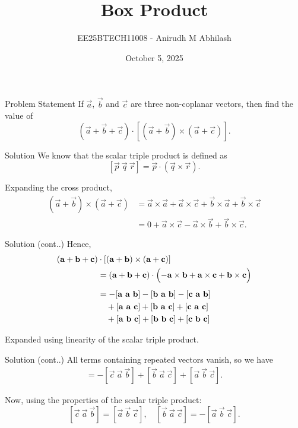 \documentclass{beamer}
\title{Box Product}
\author{EE25BTECH11008 - Anirudh M Abhilash}
\date{October 5, 2025}
\begin{document}
\begin{frame}
\titlepage
\end{frame}

\begin{frame}{Problem Statement}
If $\vec{a}$, $\vec{b}$ and $\vec{c}$ are three non-coplanar vectors, then find the value of  
\[
(\vec{a} + \vec{b} + \vec{c}) \cdot [(\vec{a} + \vec{b}) \times (\vec{a} + \vec{c})].
\]
\end{frame}

\begin{frame}{Solution}
We know that the scalar triple product is defined as  
\[
[\vec{p}\ \vec{q}\ \vec{r}] = \vec{p} \cdot (\vec{q} \times \vec{r}).
\]

Expanding the cross product,
\begin{align}
(\vec{a} + \vec{b}) \times (\vec{a} + \vec{c})
&= \vec{a} \times \vec{a} + \vec{a} \times \vec{c} + \vec{b} \times \vec{a} + \vec{b} \times \vec{c} \\[4pt]
&= 0 + \vec{a} \times \vec{c} - \vec{a} \times \vec{b} + \vec{b} \times \vec{c}.
\end{align}
\end{frame}

\begin{frame}{Solution (cont..)}
Hence,
\begin{align}
(\vec{a} + \vec{b} + \vec{c}) &\cdot [(\vec{a} + \vec{b}) \times (\vec{a} + \vec{c})] \notag\\
&= (\vec{a} + \vec{b} + \vec{c}) \cdot 
   \Bigl( -\vec{a} \times \vec{b} + \vec{a} \times \vec{c} + \vec{b} \times \vec{c} \Bigr) \notag\\[1ex]
&= -[\vec{a}\ \vec{a}\ \vec{b}] - [\vec{b}\ \vec{a}\ \vec{b}] - [\vec{c}\ \vec{a}\ \vec{b}] \notag\\
&\quad + [\vec{a}\ \vec{a}\ \vec{c}] + [\vec{b}\ \vec{a}\ \vec{c}] + [\vec{c}\ \vec{a}\ \vec{c}] \notag\\
&\quad + [\vec{a}\ \vec{b}\ \vec{c}] + [\vec{b}\ \vec{b}\ \vec{c}] + [\vec{c}\ \vec{b}\ \vec{c}]
\end{align}

Expanded using linearity of the scalar triple product.
\end{frame}

\begin{frame}{Solution (cont..)}
All terms containing repeated vectors vanish, so we have
\begin{align}
= -[\vec{c}\ \vec{a}\ \vec{b}] + [\vec{b}\ \vec{a}\ \vec{c}] + [\vec{a}\ \vec{b}\ \vec{c}].
\end{align}

Now, using the properties of the scalar triple product:
\[
[\vec{c}\ \vec{a}\ \vec{b}] = [\vec{a}\ \vec{b}\ \vec{c}], 
\quad [\vec{b}\ \vec{a}\ \vec{c}] = -[\vec{a}\ \vec{b}\ \vec{c}].
\]
\end{frame}
\end{document}
